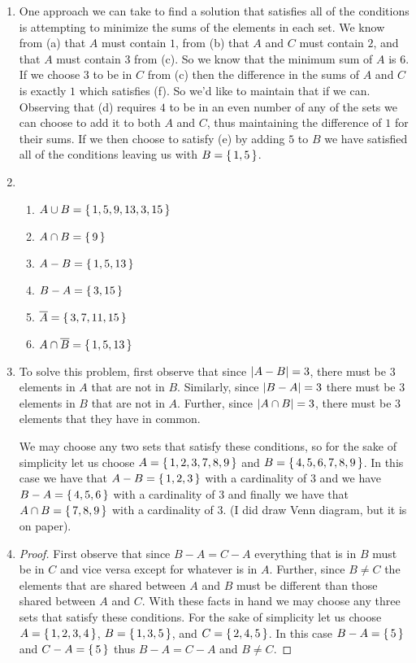 \documentclass[12pt]{article}
\begin{document}
\begin{enumerate}[label=1.\arabic*]
      \item One approach we can take to find a solution that satisfies all of the conditions is
            attempting to minimize the sums of the elements in each set.
            We know from (a) that $A$ must contain $1$, from (b) that $A$ and $C$ must contain $2$, and that $A$ must contain $3$ from (c).
            So we know that the minimum sum of $A$ is $6$. If we choose $3$ to be in $C$ from (c) then the difference in the sums of $A$ and $C$ is exactly $1$
            which satisfies (f). So we'd like to maintain that if we can. Observing that (d) requires $4$ to be in an even number of any of the sets we can
            choose to add it to both $A$ and $C$, thus maintaining the difference of $1$ for their sums. If we then choose to satisfy (e) by adding $5$ to $B$ we 
            have satisfied all of the conditions leaving us with $B=\set{1,5}$.
      \item
            \begin{enumerate}[label=(\alph*)]
              \item $A \cup B = \set{1,5,9,13,3,15}$
              \item $A \cap B = \set{9}$
              \item $A - B = \set{1,5,13}$
              \item $B - A = \set{3,15}$
              \item $\overline{A} = \set{3,7,11,15}$
              \item $A \cap \overline{B} = \set{1,5,13}$
            \end{enumerate}
      \item To solve this problem, first observe that since $\abs{A - B}=3$, there
            must be $3$ elements in $A$ that are not in $B$. Similarly, since $\abs{B - A}=3$
            there must be $3$ elements in $B$ that are not in $A$. Further, since
            $\abs{A \cap B}=3$, there must be $3$ elements that they have in common.

            We may choose any two sets that satisfy these conditions, so for the sake
            of simplicity let us choose $A=\set{1,2,3,7,8,9}$ and $B=\set{4,5,6,7,8,9}$.
            In this case we have that $A-B=\set{1,2,3}$ with a cardinality of $3$ and we
            have $B-A=\set{4,5,6}$ with a cardinality of $3$ and finally we have that
            $A \cap B=\set{7,8,9}$ with a cardinality of $3$. (I did draw Venn diagram, but it is
            on paper).
      \item \begin{proof}
            First observe that since $B-A=C-A$ everything that is in $B$ must be in $C$
            and vice versa except for whatever is in $A$. Further, since $B \neq C$ the
            elements that are shared between $A$ and $B$ must be different than those shared
            between $A$ and $C$. With these facts in hand we may choose any three sets that
            satisfy these conditions. For the sake of simplicity let us choose $A=\set{1,2,3,4}$,
            $B=\set{1,3,5}$, and $C=\set{2,4,5}$. In this case $B-A=\set{5}$ and $C-A=\set{5}$
            thus $B-A=C-A$ and $B \neq C$.
            \end{proof}
  \end{enumerate}
\end{document}
